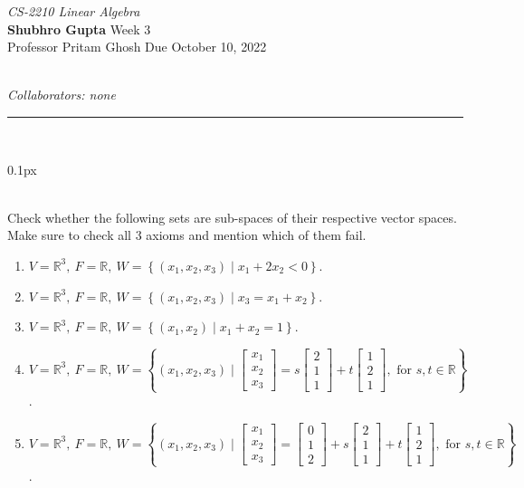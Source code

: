 \documentclass[11pt]{article}
\newcommand{\problem}[1]{\begin{adjustwidth}{0.1px}\noindent \framebox[1.2\width]{\large Problem #1}\end{adjustwidth} \bigskip\\}
\newcommand{\lesgo}[5]{
\begin{large}
\emph{#1}\smallskip \\
\textbf{Shubhro Gupta} \hfill Week #2\smallskip \\
Professor #3 \hfill Due #4\\
\end{large} \medskip \\
{\emph{Collaborators: #5}}\\
\hrule
\vspace{50px}
\\
}
\begin{document}
\lesgo{CS-2210 Linear Algebra}{3}{Pritam Ghosh}{October 10, 2022}{none}

\problem{1}
Check whether the following sets are sub-spaces of their respective vector spaces. Make sure to check all 3 axioms and mention which of them fail.
\begin{enumerate}[label=(\Alph*)]
    \item $V = \mathbb{R}^3, \ F = \mathbb{R}, \ W=\left\{\left(x_1, x_2, x_3\right) \mid x_1+2 x_2<0\right\}$.
    \item $V = \mathbb{R}^3, \ F = \mathbb{R}, \ W=\left\{\left(x_1, x_2, x_3\right) \mid x_3=x_1+ x_2\right\}$.
    \item $V = \mathbb{R}^3, \ F = \mathbb{R}, \ W=\left\{\left(x_1, x_2\right) \mid x_1+ x_2=1\right\}$.
    
    \item $V = \mathbb{R}^3, \ F = \mathbb{R}, \ W=\left\{\left(x_1, x_2, x_3\right) \mid 
\begin{bmatrix}
x_1 \\ x_2 \\ x_3
\end{bmatrix} = 
s \begin{bmatrix}
2 \\ 1 \\ 1
\end{bmatrix}
+ t
\begin{bmatrix}
1 \\ 2 \\ 1
\end{bmatrix}, \text{ for }s,t \in \mathbb{R}
    \right\}$.
    
    \item $V = \mathbb{R}^3, \ F = \mathbb{R}, \ W=\left\{\left(x_1, x_2, x_3\right) \mid 
    \begin{bmatrix}
x_1 \\ x_2 \\ x_3
\end{bmatrix} = 
\begin{bmatrix}
0 \\ 1 \\ 2
\end{bmatrix} + 
s \begin{bmatrix}
2 \\ 1 \\ 1
\end{bmatrix}
+ t
\begin{bmatrix}
1 \\ 2 \\ 1
\end{bmatrix}, \text{ for }s,t \in \mathbb{R}
    \right\}$.
    

\end{enumerate}
\end{document}
